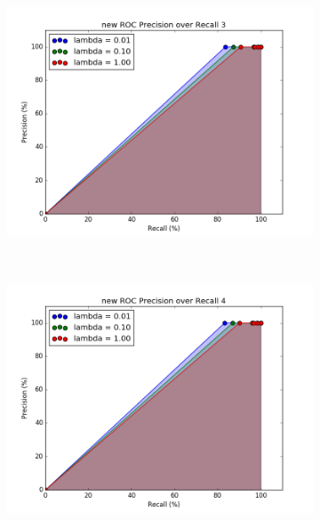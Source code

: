 \documentclass[12pt]{article}
\begin{document}
\begin{figure}[h!]
\ContinuedFloat      
    \begin{subfigure}[t]{0.5\textwidth}
        \centering
        \includegraphics[width=1.\textwidth]{graphs/problem4_ROC3}
        \caption{}
    \end{subfigure}%
    ~ 
    \begin{subfigure}[t]{0.5\textwidth}
        \centering
        \includegraphics[width=1.\textwidth]{graphs/problem4_ROC4}
        \caption{}
    \end{subfigure}%
    

\end{figure}
\end{document}
